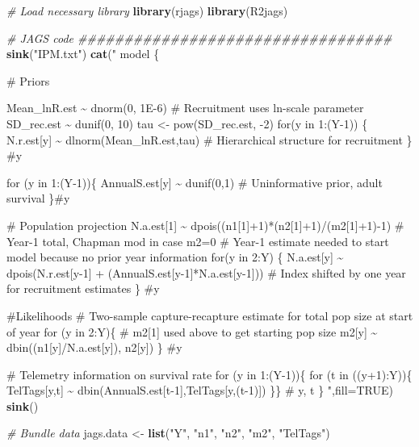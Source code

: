 \documentclass[
]{krantz}
\makeatletter
\newenvironment{Shaded}{\begin{snugshade}}{\end{snugshade}}
\newcommand{\AttributeTok}[1]{\textcolor[rgb]{0.27,0.27,0.27}{#1}}
\newcommand{\CommentTok}[1]{\textcolor[rgb]{0.37,0.37,0.37}{\textit{#1}}}
\newcommand{\ConstantTok}[1]{\textcolor[rgb]{0.37,0.37,0.37}{#1}}
\newcommand{\FunctionTok}[1]{\textcolor[rgb]{0.27,0.27,0.27}{\textbf{#1}}}
\newcommand{\NormalTok}[1]{#1}
\newcommand{\OtherTok}[1]{\textcolor[rgb]{0.37,0.37,0.37}{#1}}
\newcommand{\StringTok}[1]{\textcolor[rgb]{0.5,0.5,0.5}{#1}}
\newenvironment{kframe}{%
\medskip{}
\setlength{\fboxsep}{.8em}
 \def\at@end@of@kframe{}%
 \ifinner\ifhmode%
  \def\at@end@of@kframe{\end{minipage}}%
  \begin{minipage}{\columnwidth}%
 \fi\fi%
 \def\FrameCommand##1{\hskip\@totalleftmargin \hskip-\fboxsep
 \colorbox{shadecolor}{##1}\hskip-\fboxsep
     \hskip-\linewidth \hskip-\@totalleftmargin \hskip\columnwidth}%
 \MakeFramed {\advance\hsize-\width
   \@totalleftmargin\z@ \linewidth\hsize
   \@setminipage}}%
 {\par\unskip\endMakeFramed%
 \at@end@of@kframe}
\renewenvironment{Shaded}{\begin{kframe}}{\end{kframe}}
\makeatother
\begin{document}
\begin{Shaded}
\begin{Highlighting}[]
\CommentTok{\# Load necessary library}
\FunctionTok{library}\NormalTok{(rjags)}
\FunctionTok{library}\NormalTok{(R2jags)}

\CommentTok{\# JAGS code \#\#\#\#\#\#\#\#\#\#\#\#\#\#\#\#\#\#\#\#\#\#\#\#\#\#\#\#\#\#\#\#\#\#}
\FunctionTok{sink}\NormalTok{(}\StringTok{"IPM.txt"}\NormalTok{)}
\FunctionTok{cat}\NormalTok{(}\StringTok{"}
\StringTok{model \{}

\StringTok{\# Priors}

\StringTok{ Mean\_lnR.est \textasciitilde{} dnorm(0, 1E{-}6)  \# Recruitment uses ln{-}scale parameter}
\StringTok{ SD\_rec.est \textasciitilde{} dunif(0, 10)}
\StringTok{ tau \textless{}{-} pow(SD\_rec.est, {-}2)}
\StringTok{ for(y in 1:(Y{-}1)) \{}
\StringTok{    N.r.est[y] \textasciitilde{} dlnorm(Mean\_lnR.est,tau)}
\StringTok{     \# Hierarchical structure for recruitment}
\StringTok{  \} \#y}

\StringTok{for (y in 1:(Y{-}1))\{}
\StringTok{  AnnualS.est[y] \textasciitilde{} dunif(0,1)  \# Uninformative prior, adult survival}
\StringTok{\}\#y}

\StringTok{\# Population projection}
\StringTok{ N.a.est[1] \textasciitilde{} dpois((n1[1]+1)*(n2[1]+1)/(m2[1]+1){-}1) }
\StringTok{  \# Year{-}1 total, Chapman mod in case m2=0}
\StringTok{  \# Year{-}1 estimate needed to start model because no prior year information}
\StringTok{ for(y in 2:Y) \{}
\StringTok{     N.a.est[y] \textasciitilde{} dpois(N.r.est[y{-}1] + (AnnualS.est[y{-}1]*N.a.est[y{-}1]))}
\StringTok{     \# Index shifted by one year for recruitment estimates}
\StringTok{     \} \#y}

\StringTok{\#Likelihoods}
\StringTok{\# Two{-}sample capture{-}recapture estimate for total pop size at start of year}
\StringTok{  for (y in 2:Y)\{  \# m2[1] used above to get starting pop size}
\StringTok{    m2[y] \textasciitilde{} dbin((n1[y]/N.a.est[y]), n2[y])}
\StringTok{    \} \#y}

\StringTok{\# Telemetry information on survival rate}
\StringTok{for (y in 1:(Y{-}1))\{}
\StringTok{  for (t in ((y+1):Y))\{}
\StringTok{    TelTags[y,t] \textasciitilde{} dbin(AnnualS.est[t{-}1],TelTags[y,(t{-}1)])}
\StringTok{  \}\} \# y, t}
\StringTok{\}}
\StringTok{    "}\NormalTok{,}\AttributeTok{fill=}\ConstantTok{TRUE}\NormalTok{)}
\FunctionTok{sink}\NormalTok{()}

\CommentTok{\# Bundle data}
\NormalTok{jags.data }\OtherTok{\textless{}{-}} \FunctionTok{list}\NormalTok{(}\StringTok{"Y"}\NormalTok{, }\StringTok{"n1"}\NormalTok{, }\StringTok{"n2"}\NormalTok{, }\StringTok{"m2"}\NormalTok{, }\StringTok{"TelTags"}\NormalTok{)}


\end{Highlighting}
\end{Shaded}
\end{document}
